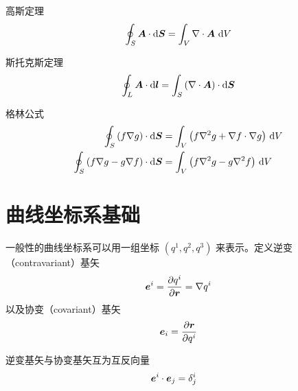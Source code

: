 高斯定理
\begin{equation}
    \oint_S \bm{A} \cdot \mathop{}\!\mathrm{d} \bm{S}
    = \int_V \nabla \cdot {\bm{A}} \, \mathop{}\!\mathrm{d} V
\end{equation}

斯托克斯定理
\begin{equation}
    \oint_L \bm{A} \cdot \mathop{}\!\mathrm{d} \bm{l}
    = \int_S \left( \nabla \cdot {\bm{A}} \right) \cdot \mathop{}\!\mathrm{d} \bm{S}
\end{equation}

格林公式
\begin{align}
    \oint_S \left( f \nabla {g} \right) \cdot \mathop{}\!\mathrm{d} \bm{S}
    &= \int_V \left(
        f \nabla^2 {g} + \nabla {f} \cdot \nabla {g}
    \right) \, \mathop{}\!\mathrm{d} V \\
    \oint_S \left( f \nabla {g} - g \nabla {f} \right) \cdot \mathop{}\!\mathrm{d} \bm{S}
    &= \int_V \left(
        f \nabla^2 {g} - g \nabla^2 {f}
    \right) \, \mathop{}\!\mathrm{d} V
\end{align}

\chapter{曲线坐标系基础}

一般性的曲线坐标系可以用一组坐标 $(q^1, q^2, q^3)$ 来表示。定义逆变（contravariant）基矢
\begin{equation}
    \bm{e}^i = \frac{\partial {q^i}}{\partial {\bm{r}}} = \nabla {q^i}
\end{equation}
以及协变（covariant）基矢
\begin{equation}
    \bm{e}_i = \frac{\partial {\bm{r}}}{\partial {q^i}}
\end{equation}

逆变基矢与协变基矢互为互反向量
\begin{align}
    \bm{e}^i \cdot \bm{e}_j &= \delta^i_j
\end{align}
